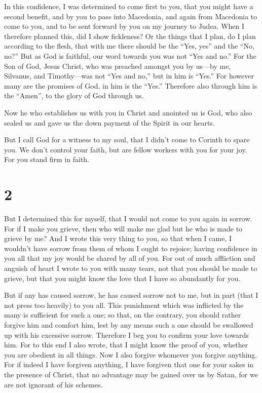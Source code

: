  In this confidence, I was determined to come first to
you, that you might have a second benefit,  and by you to
pass into Macedonia, and again from Macedonia to come to you, and to be
sent forward by you on my journey to Judea.  When I
therefore planned this, did I show fickleness? Or the things that I
plan, do I plan according to the flesh, that with me there should be the
``Yes, yes'' and the ``No, no?''  But as God is faithful,
our word towards you was not ``Yes and no.''  For the Son
of God, Jesus Christ, who was preached amongst you by us---by me,
Silvanus, and Timothy---was not ``Yes and no,'' but in him is ``Yes.''
 For however many are the promises of God, in him is the
``Yes.'' Therefore also through him is the ``Amen'', to the glory of God
through us.

 Now he who establishes us with you in Christ and
anointed us is God,  who also sealed us and gave us the
down payment of the Spirit in our hearts.

 But I call God for a witness to my soul, that I didn't
come to Corinth to spare you.  We don't control your
faith, but are fellow workers with you for your joy. For you stand firm
in faith.

\hypertarget{section-1}{%
\section{2}\label{section-1}}

 But I determined this for myself, that I would not come
to you again in sorrow.  For if I make you grieve, then
who will make me glad but he who is made to grieve by me? 
And I wrote this very thing to you, so that when I came, I wouldn't have
sorrow from them of whom I ought to rejoice; having confidence in you
all that my joy would be shared by all of you.  For out of
much affliction and anguish of heart I wrote to you with many tears, not
that you should be made to grieve, but that you might know the love that
I have so abundantly for you.

 But if any has caused sorrow, he has caused sorrow not to
me, but in part (that I not press too heavily) to you all.
 This punishment which was inflicted by the many is
sufficient for such a one;  so that, on the contrary, you
should rather forgive him and comfort him, lest by any means such a one
should be swallowed up with his excessive sorrow. 
Therefore I beg you to confirm your love towards him.  For
to this end I also wrote, that I might know the proof of you, whether
you are obedient in all things.  Now I also forgive
whomever you forgive anything. For if indeed I have forgiven anything, I
have forgiven that one for your sakes in the presence of Christ,
 that no advantage may be gained over us by Satan, for we
are not ignorant of his schemes.

